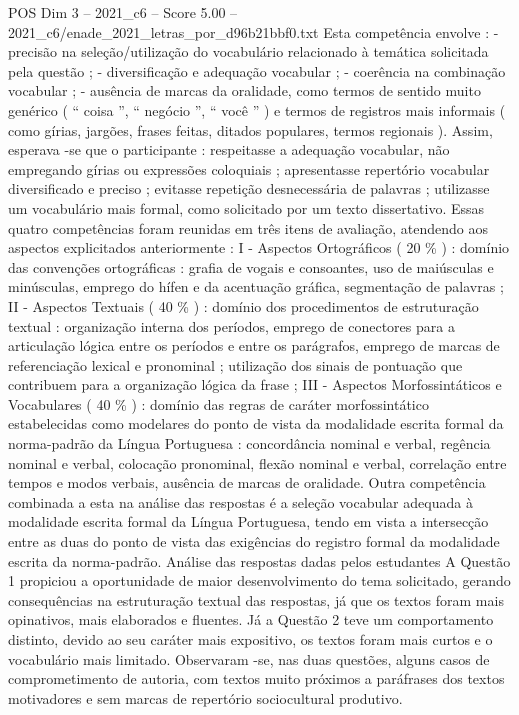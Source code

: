 \begin{textsample}{POS Dim 3 – 2021\_c6 – Score 5.00 – 2021\_c6/enade\_2021\_letras\_por\_d96b21bbf0.txt}
Esta competência envolve : - precisão na seleção/utilização do vocabulário relacionado à temática solicitada pela questão ; - diversificação e adequação vocabular ; - coerência na combinação vocabular ; - ausência de marcas da oralidade, como termos de sentido muito genérico ( “ coisa ”, “ negócio ”, “ você ” ) e termos de registros mais informais ( como gírias, jargões, frases feitas, ditados populares, termos regionais ).
Assim, esperava -se que o participante : respeitasse a adequação vocabular, não empregando gírias ou expressões coloquiais ; apresentasse repertório vocabular diversificado e preciso ; evitasse repetição desnecessária de palavras ; utilizasse um vocabulário mais formal, como solicitado por um texto dissertativo.
Essas quatro competências foram reunidas em três itens de avaliação, atendendo aos aspectos explicitados anteriormente : I - Aspectos Ortográficos ( 20 \% ) : domínio das convenções ortográficas : grafia de vogais e consoantes, uso de maiúsculas e minúsculas, emprego do hífen e da acentuação gráfica, segmentação de palavras ; II - Aspectos Textuais ( 40 \% ) : domínio dos procedimentos de estruturação textual : organização interna dos períodos, emprego de conectores para a articulação lógica entre os períodos e entre os parágrafos, emprego de marcas de referenciação lexical e pronominal ; utilização dos sinais de pontuação que contribuem para a organização lógica da frase ; III - Aspectos Morfossintáticos e Vocabulares ( 40 \% ) : domínio das regras de caráter morfossintático estabelecidas como modelares do ponto de vista da modalidade escrita formal da norma-padrão da Língua Portuguesa : concordância nominal e verbal, regência nominal e verbal, colocação pronominal, flexão nominal e verbal, correlação entre tempos e modos verbais, ausência de marcas de oralidade.
Outra competência combinada a esta na análise das respostas é a seleção vocabular adequada à modalidade escrita formal da Língua Portuguesa, tendo em vista a intersecção entre as duas do ponto de vista das exigências do registro formal da modalidade escrita da norma-padrão.
Análise das respostas dadas pelos estudantes A Questão 1 propiciou a oportunidade de maior desenvolvimento do tema solicitado, gerando consequências na estruturação textual das respostas, já que os textos foram mais opinativos, mais elaborados e fluentes.
Já a Questão 2 teve um comportamento distinto, devido ao seu caráter mais expositivo, os textos foram mais curtos e o vocabulário mais limitado.
Observaram -se, nas duas questões, alguns casos de comprometimento de autoria, com textos muito próximos a paráfrases dos textos motivadores e sem marcas de repertório sociocultural produtivo.

\end{textsample}
